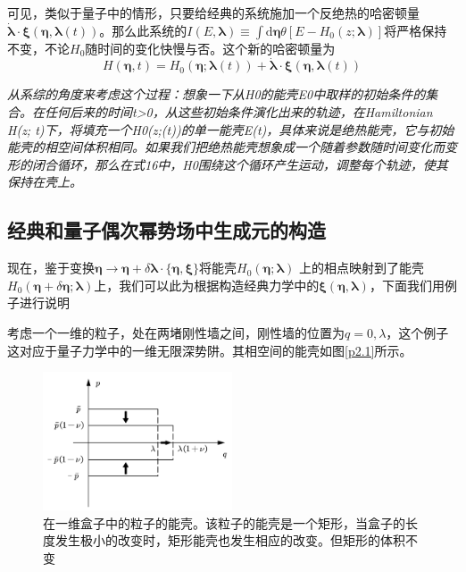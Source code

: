 可见，类似于量子中的情形，只要给经典的系统施加一个反绝热的哈密顿量$\dot{\boldsymbol{\lambda}} \cdot \boldsymbol{\xi}(\bm{\eta}, \boldsymbol{\lambda}(t))$。那么此系统的$I(E, \boldsymbol{\lambda}) \equiv \int \mathrm{d} \bm{\eta} \theta\left[E-H_{0}(z ; \boldsymbol{\lambda})\right]$将严格保持不变，不论$H_0 $随时间的变化快慢与否。这个新的哈密顿量为
\begin{equation}
    H(\bm{\eta}, t)=H_{0}(\bm{\eta} ; \boldsymbol{\lambda}(t))+\dot{\boldsymbol{\lambda}} \cdot \boldsymbol{\xi}(\bm{\eta}, \boldsymbol{\lambda}(t))
    \label{eq2.17}
\end{equation}

\emph{从系综的角度来考虑这个过程：想象一下从H0的能壳E0中取样的初始条件的集合。在任何后来的时间t>0，从这些初始条件演化出来的轨迹，在Hamiltonian H(z; t)下，将填充一个H0(z;(t))的单一能壳E(t)，具体来说是绝热能壳，它与初始能壳的相空间体积相同。如果我们把绝热能壳想象成一个随着参数随时间变化而变形的闭合循环，那么在式16中，H0围绕这个循环产生运动，调整每个轨迹，使其保持在壳上。}

\subsection{经典和量子偶次幂势场中生成元的构造}
\label{sec2.3.2}

\qquad 现在，鉴于变换$\bm{\eta} \to \bm{\eta} + \delta  \bm{\lambda} \cdot \{\bm{\eta}, \boldsymbol{\xi}\}$将能壳$H_{0}(\bm{\eta} ; \boldsymbol{\lambda})$ 上的相点映射到了能壳 $ H_{0}(\bm{\eta} + \delta \bm{\eta} ; \boldsymbol{\lambda})$上，我们可以此为根据构造经典力学中的$\boldsymbol{\xi}(\bm{\eta}, \boldsymbol{\lambda})$，下面我们用例子进行说明

考虑一个一维的粒子，处在两堵刚性墙之间，刚性墙的位置为$q=0,\lambda$，这个例子这对应于量子力学中的一维无限深势阱。其相空间的能壳如图\eqref{p2.1}所示。
\begin{figure}[!htbp]
    \begin{center}
        \includegraphics[width=0.5\textwidth]{figures/p2.1.pdf}
    \end{center}
    \caption{在一维盒子中的粒子的能壳。该粒子的能壳是一个矩形，当盒子的长度发生极小的改变时，矩形能壳也发生相应的改变。但矩形的体积不变}
    \label{p2.1}
\end{figure}

